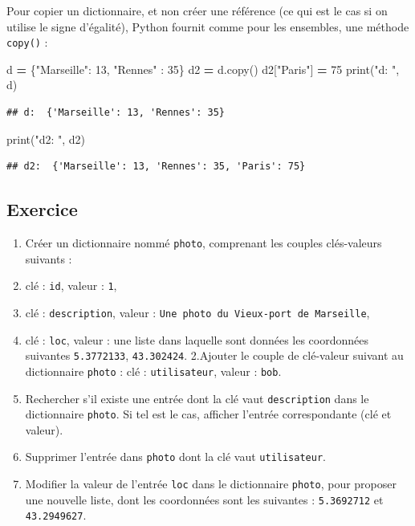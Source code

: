 \documentclass[12pt,]{book}
\newenvironment{Shaded}{\begin{snugshade}}{\end{snugshade}}
\newcommand{\DecValTok}[1]{\textcolor[rgb]{0.00,0.00,0.81}{#1}}
\newcommand{\StringTok}[1]{\textcolor[rgb]{0.31,0.60,0.02}{#1}}
\newcommand{\OperatorTok}[1]{\textcolor[rgb]{0.81,0.36,0.00}{\textbf{#1}}}
\newcommand{\BuiltInTok}[1]{#1}
\newcommand{\NormalTok}[1]{#1}
\numberwithin{equation}{section}
\numberwithin{countremarque}{section}
\let\BeginKnitrBlock\begin \let\EndKnitrBlock\end
\begin{document}
Pour copier un dictionnaire, et non créer une référence (ce qui est le
cas si on utilise le signe d'égalité), Python fournit comme pour les
ensembles, une méthode \texttt{copy()} :

\begin{Shaded}
\begin{Highlighting}[]
\NormalTok{d }\OperatorTok{=}\NormalTok{ \{}\StringTok{"Marseille"}\NormalTok{: }\DecValTok{13}\NormalTok{, }\StringTok{"Rennes"}\NormalTok{ : }\DecValTok{35}\NormalTok{\}}
\NormalTok{d2 }\OperatorTok{=}\NormalTok{ d.copy()}
\NormalTok{d2[}\StringTok{"Paris"}\NormalTok{] }\OperatorTok{=} \DecValTok{75}
\BuiltInTok{print}\NormalTok{(}\StringTok{"d: "}\NormalTok{, d)}
\end{Highlighting}
\end{Shaded}

\begin{lstlisting}
## d:  {'Marseille': 13, 'Rennes': 35}
\end{lstlisting}

\begin{Shaded}
\begin{Highlighting}[]
\BuiltInTok{print}\NormalTok{(}\StringTok{"d2: "}\NormalTok{, d2)}
\end{Highlighting}
\end{Shaded}

\begin{lstlisting}
## d2:  {'Marseille': 13, 'Rennes': 35, 'Paris': 75}
\end{lstlisting}

\subsection{Exercice}\label{exercice-1}

\BeginKnitrBlock{exframe}
\begin{enumerate}
\def\labelenumi{\arabic{enumi}.}
\item
  Créer un dictionnaire nommé \texttt{photo}, comprenant les couples
  clés-valeurs suivants :
\item
  clé : \texttt{id}, valeur : \texttt{1},
\item
  clé : \texttt{description}, valeur :
  \texttt{Une\ photo\ du\ Vieux-port\ de\ Marseille},
\item
  clé : \texttt{loc}, valeur : une liste dans laquelle sont données les
  coordonnées suivantes \texttt{5.3772133}, \texttt{43.302424}.
  2.Ajouter le couple de clé-valeur suivant au dictionnaire
  \texttt{photo} : clé : \texttt{utilisateur}, valeur : \texttt{bob}.
\item
  Rechercher s'il existe une entrée dont la clé vaut
  \texttt{description} dans le dictionnaire \texttt{photo}. Si tel est
  le cas, afficher l'entrée correspondante (clé et valeur).
\item
  Supprimer l'entrée dans \texttt{photo} dont la clé vaut
  \texttt{utilisateur}.
\item
  Modifier la valeur de l'entrée \texttt{loc} dans le dictionnaire
  \texttt{photo}, pour proposer une nouvelle liste, dont les coordonnées
  sont les suivantes : \texttt{5.3692712} et \texttt{43.2949627}.
\end{enumerate}
\EndKnitrBlock{exframe}
\end{document}
